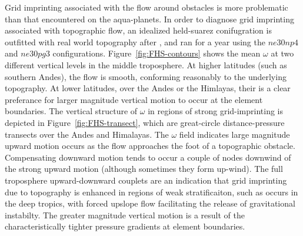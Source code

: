 \documentclass[twocol]{ametsoc}
\begin{document}
Grid imprinting associated with the flow around obstacles is more problematic than that encountered on the aqua-planets. In order to diagnose grid imprinting associated with topographic flow, an idealized held-suarez conifugration \citep{HS1994} is outfitted with real world topography after \cite{FRETAL2000WMR,BETAL2006MWR}, and ran for a year using the $ne30np4$ and $ne30pg3$ configurations. Figure~\ref{fig:FHS-contours} shows the mean $\omega$ at two different vertical levels in the middle troposphere. At higher latitudes (such as southern Andes), the flow is smooth, conforming reasonably to the underlying topography. At lower latitudes, over the Andes or the Himlayas, their is a clear preferance for larger magnitude vertical motion to occur at the element boundaries. The vertical structure of $\omega$ in regions of strong grid-imprinting is depicted in Figure~\ref{fig:FHS-transect}, which are great-circle distance-pressure transects over the Andes and Himalayas. The $\omega$ field indicates large magnitude upward motion occurs as the flow approaches the foot of a topographic obstacle. Compensating downward motion tends to occur a couple of nodes downwind of the strong upward motion (although sometimes they form up-wind). The full troposphere upward-downward couplets are an indication that grid imprinting due to topography is enhanced in regions of weak stratificaiton, such as occurs in the deep tropics, with forced upslope flow facilitating the release of gravitational instabilty. The greater magnitude vertical motion is a result of the characteristically tighter pressure gradients at element boundaries. 
\end{document}
